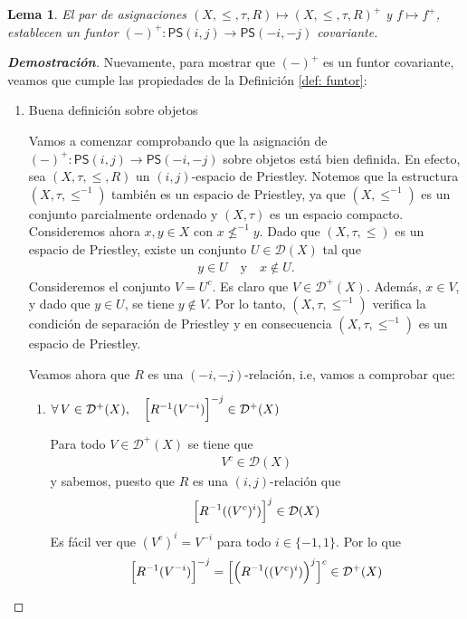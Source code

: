 \documentclass[12pt]{book}
\newtheorem{lemma}[theorem]{Lema}
\newcommand{\PS}{\mathsf{PS}}
\begin{document}
\begin{lemma} El par de asignaciones $(X,\leq,\tau,R) \mapsto (X,\leq,\tau,R)^{+}$ y $f \mapsto f^{+}$, establecen un funtor $(-)^{+} \colon \mathsf{PS}(i,j) \to \mathsf{PS}(-i,-j)$ covariante.
\end{lemma}
\begin{proof}[\textbf{Demostración}]
Nuevamente, para mostrar que $(-)^{+}$ es un funtor covariante, veamos que cumple las propiedades de la Definición \ref{def: funtor}:

\begin{enumerate}
    \item Buena definición sobre objetos
    
Vamos a comenzar comprobando que la asignación de $(-)^{+} \colon \PS(i,j) \to \PS(-i,-j)$ sobre objetos está bien definida. En efecto, sea $(X,\tau,\leq,R)$ un $(i,j)$-espacio de Priestley. Notemos que la estructura $(X,\tau,\leq^{-1})$ también es un espacio de Priestley, ya que  $(X,\leq^{-1})$ es un conjunto parcialmente ordenado y $(X,\tau)$ es un espacio compacto. Consideremos ahora $x,y\in X$ con $x \nleq^{-1} y$. Dado que $(X,\tau,\leq)$ es un espacio de Priestley, existe un conjunto $U \in \mathcal{D}(X)$ tal que  
\begin{align*}
    y \in U \quad \text{y} \quad x\notin U.
\end{align*}
Consideremos el conjunto $V=U^c$. Es claro que $V \in \mathcal{D}^{+}(X)$. Además, $x\in V$, y dado que $y\in U$, se tiene $y\notin V$. Por lo tanto, $(X,\tau,\leq^{-1})$ verifica la condición de separación de Priestley y en consecuencia $(X,\tau,\leq^{-1})$ es un espacio de Priestley.  \\
\vspace{0.2cm}

Veamos ahora que $R$ es una \((-i,-j)\)-relación, i.e, vamos a comprobar que:
\begin{enumerate}
\item $\forall\, V\in \mathcal{D}^{+}(X), \quad \Bigl[R^{-1}(V^{-i})\Bigr]^{-j} \in \mathcal{D}^{+}(X)$

Para todo $V\in \mathcal{D}^{+}(X)$ se tiene que 
\begin{align*}
V^c \in \mathcal{D}(X)
\end{align*}
y sabemos, puesto que $R$ es una $(i,j)$-relación que
\begin{align*}
\Bigl[ R^{-1}((V^{c})^{i}) \Bigr]^{j} \in \mathcal{D}(X)
\end{align*}
Es fácil ver que $(V^{c})^i=V^{-i}$ para todo $i\in \{-1,1\}$. Por lo que
\begin{align*}
\Bigl[R^{-1}(V^{-i})\Bigr]^{-j}= 
\Bigl[\Bigl(R^{-1}((V^{c})^i)\Bigr)^j\Bigr]^{c}\in \mathcal{D}^{+}(X)
\end{align*}


\end{enumerate}
\end{enumerate}
\end{proof}
\end{document}
